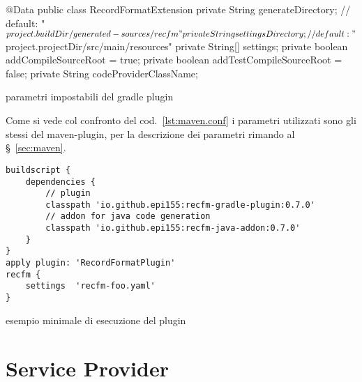 \documentclass[a4paper,10pt]{report}
\newif\ifesource
\newenvironment{elisting}[1][H]
  {\captionsetup{aboveskip=0pt}\begin{listing}[#1]}
  {\end{listing}%
}
\begin{document}
\ifesource
\begin{figure*}[!htb]
\begin{lstlisting}[language=java, caption=parametri impostabili del gradle plugin, 
label=lst:gradle.conf]
@Data
public class RecordFormatExtension {
    private String generateDirectory; // default: "${project.buildDir}/generated-sources/recfm"
    private String settingsDirectory; // default: "${project.projectDir}/src/main/resources"
    private String[] settings;
    private boolean addCompileSourceRoot = true;
    private boolean addTestCompileSourceRoot = false;
    private String codeProviderClassName;
}
\end{lstlisting}
\end{figure*}
\else
\begin{elisting}[!htb]
\begin{javacode}
@Data
public class RecordFormatExtension {
    private String generateDirectory; // default: "${project.buildDir}/generated-sources/recfm"
    private String settingsDirectory; // default: "${project.projectDir}/src/main/resources"
    private String[] settings;
    private boolean addCompileSourceRoot = true;
    private boolean addTestCompileSourceRoot = false;
    private String codeProviderClassName;
}
\end{javacode}
\caption{parametri impostabili del gradle plugin}
\label{lst:gradle.conf}
\end{elisting}
\fi
Come si vede col confronto del cod.~\ref{lst:maven.conf} i parametri utilizzati
sono gli stessi del maven-plugin, per la descrizione dei parametri rimando
al \S~\ref{sec:maven}.

\begin{elisting}[!htb]
\begin{verbatim}
buildscript {
    dependencies {
        // plugin
        classpath 'io.github.epi155:recfm-gradle-plugin:0.7.0'
        // addon for java code generation
        classpath 'io.github.epi155:recfm-java-addon:0.7.0'
    }
}
apply plugin: 'RecordFormatPlugin'
recfm {
    settings  'recfm-foo.yaml'
}
\end{verbatim}
\caption{esempio minimale di esecuzione del plugin}
\label{lst:grd-xmpl}
\end{elisting}


\part{Service Provider}\label{vol:sp}
\end{document}
